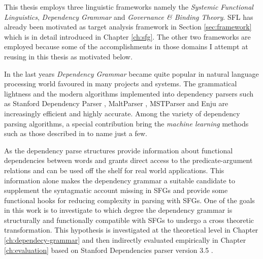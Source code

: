 %
This thesis employs three linguistic frameworks namely the \textit{Systemic Functional Linguistics}, \textit{Dependency Grammar} and \textit{Governance \& Binding Theory}. SFL has already been motivated as target analysis framework in Section \ref{sec:framework} which is in detail introduced in Chapter \ref{ch:sfg}. The other two frameworks are employed because some of the accomplishments in those domains I attempt at reusing in this thesis as motivated below. 


%
In the last years \textit{Dependency Grammar} \citep{Tesniere2015} became quite popular in natural language processing world favoured in many projects and systems. The grammatical lightness and the  modern algorithms implemented into dependency parsers such as Stanford Dependency Parser \citep{Marneffe2006}, MaltParser \citep{Nivre2006}, MSTParser \citep{McDonald2006} and Enju \citep{Miyao2005} are increasingly efficient and highly accurate. Among the variety of dependency parsing algorithms, a special contribution bring the \textit{machine learning} methods such as those described in \citet{mcdonald2005online, mcdonald2006online, carreras2007experiments, zhang2011transition, pei2015effective} to name just a few. 

As the dependency parse structures provide information about functional dependencies between words and grants direct access to the predicate-argument relations and can be used off the shelf for real world applications. 
This information alone makes the dependency grammar a suitable candidate to supplement the syntagmatic account missing in SFGs and provide some functional hooks for reducing complexity in parsing with SFGs. One of the goals in this work is to investigate to which degree the dependency grammar is structurally and functionally compatible with SFGs to undergo a cross theoretic transformation. This hypothesis is investigated at the theoretical level in Chapter \ref{ch:dependecy-grammar} and then indirectly evaluated empirically in Chapter \ref{ch:evaluation} based on Stanford Dependencies parser version 3.5 \citep{Marneffe2008a,Marneffe2008, Marneffe2014}. 

